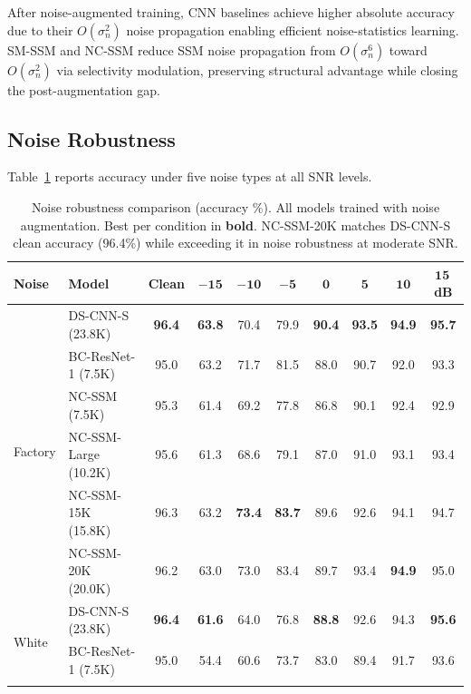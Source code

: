 \documentclass[journal]{IEEEtran}
\begin{document}
After noise-augmented training, CNN baselines achieve higher absolute accuracy due to their $O(\sigma_n^2)$ noise propagation enabling efficient noise-statistics learning.
SM-SSM and NC-SSM reduce SSM noise propagation from $O(\sigma_n^6)$ toward $O(\sigma_n^2)$ via selectivity modulation, preserving structural advantage while closing the post-augmentation gap.


\subsection{Noise Robustness}

Table~\ref{tab:noise_main} reports accuracy under five noise types at all SNR levels.

\begin{table}[t]
\centering
\caption{Noise robustness comparison (accuracy \%). All models trained with noise augmentation. Best per condition in \textbf{bold}. NC-SSM-20K matches DS-CNN-S clean accuracy (96.4\%) while exceeding it in noise robustness at moderate SNR.}
\label{tab:noise_main}
\small
\begin{tabular}{ll|cccccccc}
\toprule
\textbf{Noise} & \textbf{Model} & \textbf{Clean} & $\mathbf{-15}$ & $\mathbf{-10}$ & $\mathbf{-5}$ & $\mathbf{0}$ & $\mathbf{5}$ & $\mathbf{10}$ & $\mathbf{15}$\,\textbf{dB} \\
\midrule
\multirow{6}{*}{Factory}
  & DS-CNN-S (23.8K)       & \textbf{96.4} & \textbf{63.8} & 70.4 & 79.9 & \textbf{90.4} & \textbf{93.5} & \textbf{94.9} & \textbf{95.7} \\
  & BC-ResNet-1 (7.5K)     & 95.0 & 63.2 & 71.7 & 81.5 & 88.0 & 90.7 & 92.0 & 93.3 \\
\cmidrule{2-10}
  & NC-SSM (7.5K)          & 95.3 & 61.4 & 69.2 & 77.8 & 86.8 & 90.1 & 92.4 & 92.9 \\
  & NC-SSM-Large (10.2K)   & 95.6 & 61.3 & 68.6 & 79.1 & 87.0 & 91.0 & 93.1 & 93.4 \\
  & NC-SSM-15K (15.8K) & 96.3 & 63.2 & \textbf{73.4} & \textbf{83.7} & 89.6 & 92.6 & 94.1 & 94.7 \\
  & NC-SSM-20K (20.0K) & 96.2 & 63.0 & 73.0 & 83.4 & 89.7 & 93.4 & \textbf{94.9} & 95.0 \\
\midrule
\multirow{6}{*}{White}
  & DS-CNN-S (23.8K)       & \textbf{96.4} & \textbf{61.6} & 64.0 & 76.8 & \textbf{88.8} & 92.6 & 94.3 & \textbf{95.6} \\
  & BC-ResNet-1 (7.5K)     & 95.0 & 54.4 & 60.6 & 73.7 & 83.0 & 89.4 & 91.7 & 93.6 \\
\cmidrule{2-10}

\end{tabular}
\end{table}
\end{document}
